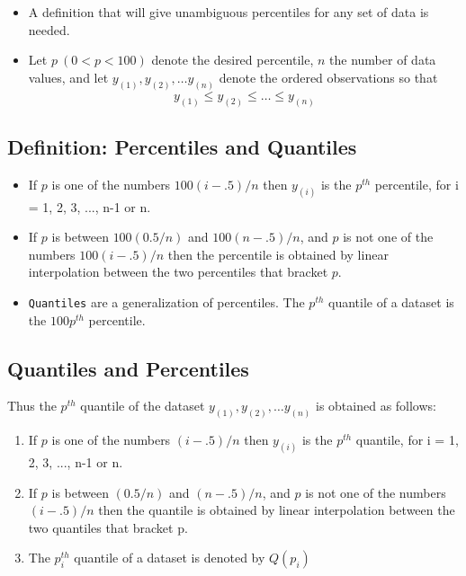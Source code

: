 \documentclass[
  letterpaper,
  DIV=11,
  numbers=noendperiod]{scrartcl}
\begin{document}
\begin{itemize}
\item
  A definition that will give unambiguous percentiles for any set of
  data is needed.
\item
  Let \(p\ (0 < p < 100)\) denote the desired percentile, \(n\) the
  number of data values, and let \(y_{(1)}, y_{(2)}, \ldots y_{(n)}\)
  denote the ordered observations so that
  \[y_{(1)} \le y_{(2)} \le \ldots  \le y_{(n)}\]
\end{itemize}

\subsection{Definition: Percentiles and
Quantiles}\label{definition-percentiles-and-quantiles}

\begin{itemize}
\item
  If \(p\) is one of the numbers \(100(i-.5)/n\) then \(y_{(i)}\) is the
  \(p^{th}\) {percentile}, for i = 1, 2, 3, ..., n-1 or n.
\item
  If \(p\) is between \(100(0.5/n)\) and \(100(n-.5)/n\), and \(p\) is
  not one of the numbers \(100(i-.5)/n\) then the percentile is obtained
  by linear interpolation between the two percentiles that bracket
  \(p\).
\item
  \texttt{Quantiles} are a generalization of percentiles. The \(p^{th}\)
  quantile of a dataset is the \(100p^{th}\) percentile.
\end{itemize}

\subsection{Quantiles and
Percentiles}\label{quantiles-and-percentiles-3}

Thus the \(p^{th}\) {quantile} of the dataset
\(y_{(1)}, y_{(2)}, \ldots y_{(n)}\) is obtained as follows:

\begin{enumerate}
\def\labelenumi{\arabic{enumi}.}
\item
  If \(p\) is one of the numbers \((i-.5)/n\) then \(y_{(i)}\) is the
  \(p^{th}\) quantile, for i = 1, 2, 3, ..., n-1 or n.
\item
  If \(p\) is between \((0.5/n)\) and \((n-.5)/n\), and \(p\) is not one
  of the numbers \((i-.5)/n\) then the quantile is obtained by linear
  interpolation between the two quantiles that bracket p.
\item
  The \(p_i^{th}\) quantile of a dataset is denoted by \(Q(p_i)\)
\end{enumerate}
\end{document}

